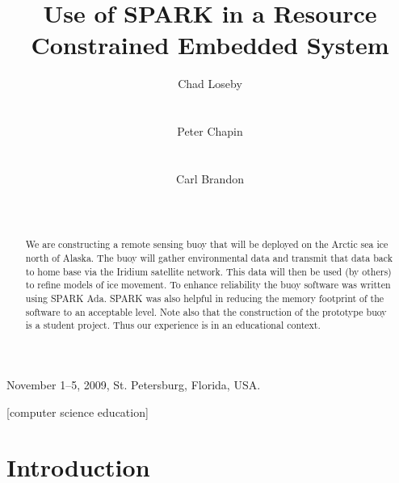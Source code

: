 \documentclass{sig-alternate}
\begin{document}
 {November 1--5, 2009, St. Petersburg, Florida, USA.} 
\title{Use of SPARK in a Resource Constrained Embedded System}

\author{
\alignauthor
Chad Loseby\\
       \\
       \\
\alignauthor
Peter Chapin\\
       \\
       \\
\alignauthor
Carl Brandon\\
       \\
       \\
}

\maketitle

\begin{abstract}
  We are constructing a remote sensing buoy that will be deployed on the Arctic sea ice north of
  Alaska. The buoy will gather environmental data and transmit that data back to home base via
  the Iridium satellite network. This data will then be used (by others) to refine models of ice
  movement. To enhance reliability the buoy software was written using SPARK Ada. SPARK was also
  helpful in reducing the memory footprint of the software to an acceptable level. Note also
  that the construction of the prototype buoy is a student project. Thus our experience is in an
  educational context.
\end{abstract}

[computer
science education]


\section{Introduction}
\end{document}
